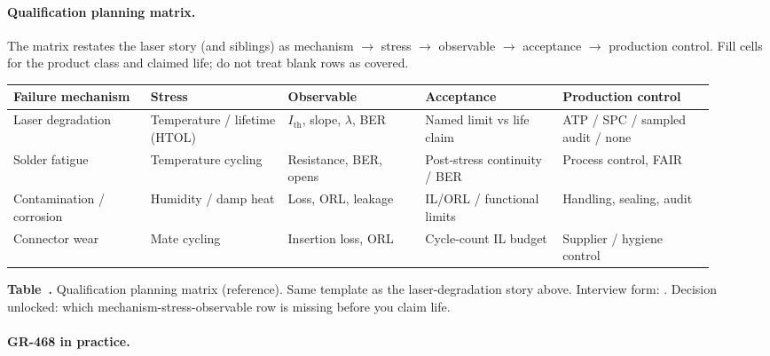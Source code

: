 \paragraph{Qualification planning matrix.}
\label{sec:qual-planning-matrix}

The matrix restates the laser story (and siblings) as
mechanism $\rightarrow$ stress $\rightarrow$ observable $\rightarrow$
acceptance $\rightarrow$ production control. Fill cells for the product class
and claimed life; do not treat blank rows as covered.

\begin{table}[ht]
\label{tab:qual-planning-matrix}%
\centering
\setlength{\tabcolsep}{3pt}%
\footnotesize
\renewcommand{\arraystretch}{1.15}%
\begin{tabular}{@{}p{0.18\linewidth}p{0.18\linewidth}p{0.18\linewidth}p{0.18\linewidth}p{0.20\linewidth}@{}}
\toprule
Failure mechanism & Stress & Observable & Acceptance & Production control \\
\midrule
Laser degradation & Temperature / lifetime (HTOL) & $I_\mathrm{th}$, slope, $\lambda$, BER & Named limit vs life claim & ATP / SPC / sampled audit / none \\
\addlinespace[0.7em]
Solder fatigue & Temperature cycling & Resistance, BER, opens & Post-stress continuity / BER & Process control, FAIR \\
\addlinespace[0.7em]
Contamination / corrosion & Humidity / damp heat & Loss, ORL, leakage & IL/ORL / functional limits & Handling, sealing, audit \\
\addlinespace[0.7em]
Connector wear & Mate cycling & Insertion loss, ORL & Cycle-count IL budget & Supplier / hygiene control \\
\bottomrule
\end{tabular}
\par\medskip
{\raggedright\footnotesize\textbf{Table~\thetable.} Qualification planning
matrix (reference). Same template as the laser-degradation story above.
Interview form: . Decision unlocked:
which mechanism-stress-observable row is missing before you claim life.\par}
\end{table}

\paragraph{GR-468 in practice.}
\label{sec:gr468}

